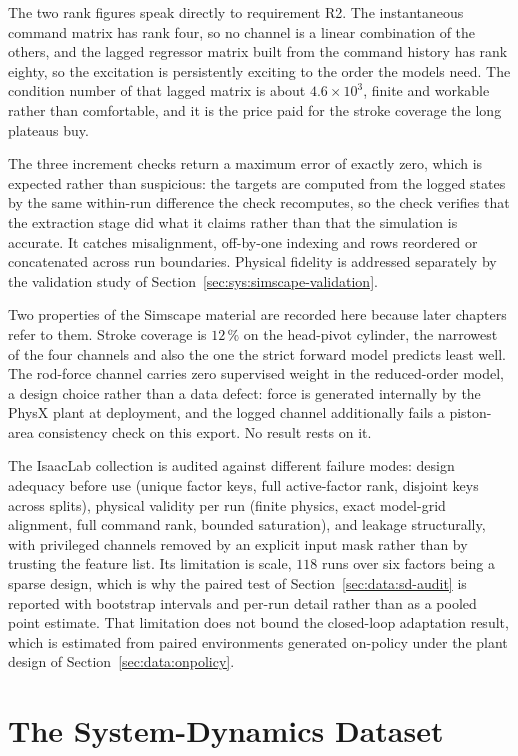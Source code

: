 The two rank figures speak directly to requirement R2. The instantaneous command
matrix has rank four, so no channel is a linear combination of the others, and
the lagged regressor matrix built from the command history has rank eighty, so
the excitation is persistently exciting to the order the models need. The
condition number of that lagged matrix is about $4.6\times10^{3}$, finite and
workable rather than comfortable, and it is the price paid for the stroke
coverage the long plateaus buy.

The three increment checks return a maximum error of exactly zero, which is
expected rather than suspicious: the targets are computed from the logged states
by the same within-run difference the check recomputes, so the check verifies
that the extraction stage did what it claims rather than that the simulation is
accurate. It catches misalignment, off-by-one indexing and rows reordered or
concatenated across run boundaries. Physical fidelity is addressed separately by
the validation study of Section~\ref{sec:sys:simscape-validation}.

Two properties of the Simscape material are recorded here because later chapters
refer to them. Stroke coverage is $12\,\%$ on the head-pivot cylinder, the
narrowest of the four channels and also the one the strict forward model
predicts least well. The rod-force channel carries zero supervised weight in the
reduced-order model, a design choice rather than a data defect: force is
generated internally by the PhysX plant at deployment, and the logged channel
additionally fails a piston-area consistency check on this export. No result
rests on it.

The IsaacLab collection is audited against different failure modes: design
adequacy before use (unique factor keys, full active-factor rank, disjoint keys
across splits), physical validity per run (finite physics, exact model-grid
alignment, full command rank, bounded saturation), and leakage structurally,
with privileged channels removed by an explicit input mask rather than by
trusting the feature list. Its limitation is scale, $118$ runs over six factors
being a sparse design, which is why the paired test of
Section~\ref{sec:data:sd-audit} is reported with bootstrap intervals and per-run
detail rather than as a pooled point estimate. That limitation does not bound
the closed-loop adaptation result, which is estimated from paired environments
generated on-policy under the plant design of
Section~\ref{sec:data:onpolicy}.

\section{The System-Dynamics Dataset}
\label{sec:data:system-dynamics}

